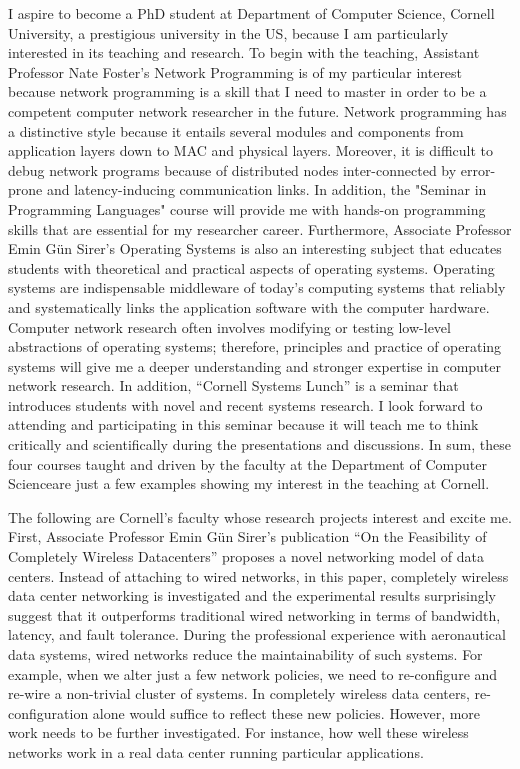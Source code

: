 \documentclass[a4paper,10pt]{report}
\newcommand{\university}{Cornell University}
\newcommand{\department}{Department of Computer Science}
\newcommand{\uniabbre}{Cornell}
\begin{document}
\vspace{0.2cm}
I aspire to become a PhD student at \department, \university, a prestigious university in the US, because I am particularly interested in its teaching and research. To begin with the teaching, Assistant Professor Nate Foster's Network Programming is of my particular interest because network programming is a skill that I need to master in order to be a competent computer network researcher in the future. Network programming has a distinctive style because it entails several modules and components from application layers down to MAC and physical layers. Moreover, it is difficult to debug network programs because of distributed nodes inter-connected by error-prone and latency-inducing communication links. In addition, the "Seminar in Programming Languages" course will provide me with hands-on programming skills that are essential for my researcher career. Furthermore, Associate Professor Emin Gün Sirer's Operating Systems is also an interesting subject that educates students with theoretical and practical aspects of operating systems. Operating systems are indispensable middleware of today's computing systems that reliably and systematically links the application software with the computer hardware. Computer network research often involves modifying or testing low-level abstractions of operating systems; therefore, principles and practice of operating systems will give me a deeper understanding and stronger expertise in computer network research. In addition, ``Cornell Systems Lunch'' is a seminar that introduces students with novel and recent systems research. I look forward to attending and participating in this seminar because it will teach me to think critically and scientifically during the presentations and discussions. In sum, these four courses taught and driven by the faculty at the \department \space are just a few examples showing my interest in the teaching at \uniabbre .

\vspace{0.2cm}
The following are \uniabbre's faculty whose research projects interest and excite me. First, Associate Professor Emin Gün Sirer's publication ``On the Feasibility of Completely Wireless Datacenters'' proposes a novel networking model of data centers. Instead of attaching to wired networks, in this paper, completely wireless data center networking is investigated and the experimental results surprisingly suggest that it outperforms traditional wired networking in terms of bandwidth, latency, and fault tolerance. During the professional experience with aeronautical data systems, wired networks reduce the maintainability of such systems. For example, when we alter just a few network policies, we need to re-configure and re-wire a non-trivial cluster of systems. In completely wireless data centers, re-configuration alone would suffice to reflect these new policies. However, more work needs to be further investigated. For instance, how well these wireless networks work in a real data center running particular applications. 
\end{document}
